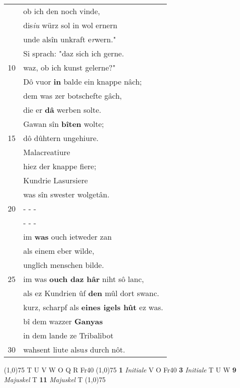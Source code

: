 \documentclass[8pt,a4paper,notitlepage]{article}
\begin{document}
\begin{table}[ht]
\begin{minipage}[t]{0.5\linewidth}
\begin{tabular}{rl}
 & ob ich den noch vinde,\\ 
 & dis\textit{iu} würz sol in wol ernern\\ 
 & unde alsîn unkraft e\textit{r}wern."\\ 
 & Si sprach: "daz sich ich gerne.\\ 
10 & waz, ob ich kunst gelerne?"\\ 
 & Dô vuor \textbf{in} balde ein knappe nâch;\\ 
 & dem was zer botschefte gâch,\\ 
 & die er \textbf{dâ} werben solte.\\ 
 & Gawan sîn \textbf{bîten} wolte;\\ 
15 & dô dûhtern ungehiure.\\ 
 & Malacreatiure\\ 
 & hiez der knappe fiere;\\ 
 & Kundrie Lasursiere\\ 
 & was sîn swester wolgetân.\\ 
20 & \multicolumn{1}{l}{ - - - }\\ 
 & \multicolumn{1}{l}{ - - - }\\ 
 & im \textbf{was} ouch ietweder zan\\ 
 & als einem eber wilde,\\ 
 & unglîch menschen bilde.\\ 
25 & im was \textbf{ouch daz hâr} niht sô lanc,\\ 
 & als ez Kundrien ûf \textbf{den} mûl dort swanc.\\ 
 & kurz, scharpf als \textbf{eines igels hût} ez was.\\ 
 & bî dem wazzer \textbf{Ganyas}\\ 
 & in dem lande ze Tribalibot\\ 
30 & wahsent liute alsu\textit{s} durch nôt.\\ 
\end{tabular}
\scriptsize
\line(1,0){75} \newline
T U V W O Q R Fr40 \newline
\line(1,0){75} \newline
\textbf{1} \textit{Initiale} V O Fr40  \textbf{3} \textit{Initiale} T U W  \textbf{9} \textit{Majuskel} T  \textbf{11} \textit{Majuskel} T  \newline
\line(1,0){75} \newline

\end{minipage}
\end{table}
\end{document}
